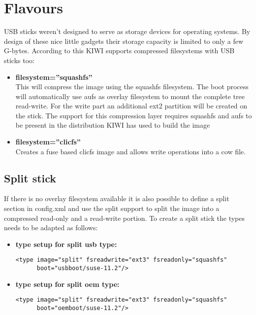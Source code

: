 \section{Flavours}

USB sticks weren't designed to serve as storage devices for
operating systems. By design of these nice little gadgets their
storage capacity is limited to only a few G-bytes. According to
this KIWI supports compressed filesystems with USB sticks too:  

\begin{itemize}
\item \textbf{filesystem=''squashfs''}\\
      This will compress the image using the squashfs filesystem. The
      boot process will automatically use aufs as overlay filesystem to
      mount the complete tree read-write. For the write part an additional
      ext2 partition will be created on the stick. The support for this
      compression layer requires squashfs and aufs to be present in
      the distribution KIWI has used to build the image 
\item \textbf{filesystem=''clicfs''}\\
      Creates a fuse based clicfs image and allows write operations
      into a cow file.
\end{itemize}

\subsection{Split stick}
If there is no overlay filesystem available it is also possible to
define a split section in config.xml and use the split support to
split the image into a compressed read-only and a read-write portion.
To create a split stick the types needs to be adapted as follows:

\begin{itemize}
\item \textbf{type setup for split usb type:}

      \begin{Command}{12cm}
      \begin{verbatim}
<type image="split" fsreadwrite="ext3" fsreadonly="squashfs"
      boot="usbboot/suse-11.2"/>
      \end{verbatim}
      \end{Command}
\item \textbf{type setup for split oem type:}

      \begin{Command}{12cm}
      \begin{verbatim}
<type image="split" fsreadwrite="ext3" fsreadonly="squashfs"
      boot="oemboot/suse-11.2"/>
      \end{verbatim}
      \end{Command}
\end{itemize}

